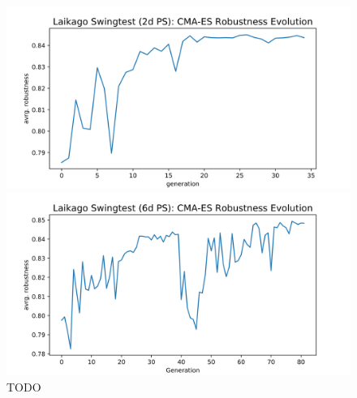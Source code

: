     \begin{figure}[h]\label{fig:}
        \centering
        \begin{minipage}{0.5\textwidth}
            \centering
            \includegraphics[width=\textwidth]{figures/swingtest_2dPS_cmaes.png} %
        \end{minipage}\hfill
        \begin{minipage}{0.5\textwidth}
            \centering
            \includegraphics[width=\textwidth]{figures/swingtest_6d_cmaes.png} %
        \end{minipage}
    \caption{TODO}
    \end{figure}    






















